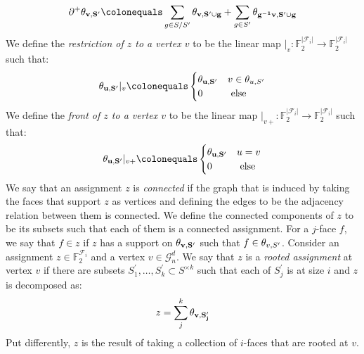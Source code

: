 \begin{definition}
\begin{equation*}
    \begin{split}
      \partial^{+} \rotfvs{} \colonequals \sum_{g \in S/S^{\prime}} \rotfv{v}{S^{\prime} \cup g} + \sum_{g \in S^{\prime}} \rotfv{g^{-1}v}{S^{\prime}\cup g} 
    \end{split}
  \end{equation*}
  We define the \textit{restriction of $z$ to a vertex $v$} to be the linear map $|_{v} \colon \mathbb{F}_{2}^{|\mathcal{F}_{i}|} \rightarrow \mathbb{F}_{2}^{|\mathcal{F}_{i}|}$ such that: 
  \begin{equation*}
    \begin{split}
      \rotfv{u}{S^{\prime}} |_{v} \colonequals    
      \begin{cases}
      \rotfv{u}{S^{\prime}}  & v \in \theta_{u,S^{\prime}}  \\ 
        0 & \text{ else }
      \end{cases}
    \end{split}
  \end{equation*}
  We define the \textit{front of $z$ to a vertex $v$} to be the linear map $|_{v+} \colon \mathbb{F}_{2}^{|\mathcal{F}_{i}|} \rightarrow \mathbb{F}_{2}^{|\mathcal{F}_{i}|}$ such that: 
  \begin{equation*}
    \begin{split}
      \rotfv{u}{S^{\prime}} |_{v+} \colonequals    
      \begin{cases}
      \rotfv{u}{S^{\prime}}  & u = v \\ 
        0 & \text{ else }
      \end{cases}
    \end{split}
  \end{equation*}
  We say that an assignment $z$ is \textit{connected} if the graph that is induced by taking the faces that support $z$ as vertices and defining the edges to be the adjacency relation between them is connected. We define the connected components of $z$ to be its subsets such that each of them is a connected assignment. For a $j$-face $f$, we say that $f \in z$ if $z$ has a support on $\mathbf{\theta_{v ,S^{\prime}}{} }{}$ such that $f \in \theta_{v ,S^{\prime}}{}$. Consider an assignment $z \in \mathbb{F}_{2}^{\mathcal{F}_{i}}$ and a vertex $v \in \mathcal{G}_{n}^{d}$. We say that $z$ is a \textit{rooted assignment} at vertex $v$ if there are subsets $S^{\prime}_{1}, \ldots, S^{\prime}_{k} \subset S^{\times k}$ such that each of $S^{\prime}_{j}$ is at size $i$ and $z$ is decomposed as:
  \begin{equation*}
    \begin{split}
    z = \sum_{j}^{k}\mathbf{\theta_{v ,S^{\prime}_{j}} }
    \end{split}
  \end{equation*}
  Put differently, $z$ is the result of taking a collection of $i$-faces that are rooted at $v$.
\end{definition}

